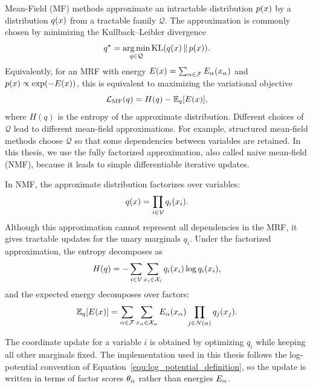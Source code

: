 Mean-Field (MF) methods approximate an intractable distribution $p(x)$ by a distribution $q(x)$ from a tractable family $\mathcal{Q}$. The approximation is commonly chosen by minimizing the Kullback--Leibler divergence
\begin{equation}
    \label{equ:mean_field_kl}
    q^\star
    =
    \operatorname*{arg\,min}_{q\in\mathcal{Q}}
    \mathrm{KL}(q(x)\,\|\,p(x)).
\end{equation}
Equivalently, for an MRF with energy $E(x)=\sum_{\alpha\in\mathcal{F}}E_{\alpha}(x_{\alpha})$ and $p(x)\propto \exp(-E(x))$, this is equivalent to maximizing the variational objective
\begin{equation}
    \label{equ:mean_field_objective}
    \mathcal{L}_{\mathrm{MF}}(q)
    =
    H(q)
    -
    \mathbb{E}_{q}[E(x)] ,
\end{equation}
where $H(q)$ is the entropy of the approximate distribution. Different choices of $\mathcal{Q}$ lead to different mean-field approximations. For example, structured mean-field methods choose $\mathcal{Q}$ so that some dependencies between variables are retained. In this thesis, we use the fully factorized approximation, also called naive mean-field (NMF), because it leads to simple differentiable iterative updates.

In NMF, the approximate distribution factorizes over variables:
\begin{equation}
    \label{equ:nmf_factorization}
    q(x)
    =
    \prod_{i\in\mathcal{V}} q_i(x_i).
\end{equation}
Although this approximation cannot represent all dependencies in the MRF, it gives tractable updates for the unary marginals $q_i$. Under the factorized approximation, the entropy decomposes as
\begin{equation}
    \label{equ:nmf_entropy}
    H(q)
    =
    -\sum_{i\in\mathcal{V}}\sum_{x_i\in\mathcal{X}_i}
    q_i(x_i)\log q_i(x_i),
\end{equation}
and the expected energy decomposes over factors:
\begin{equation}
    \label{equ:nmf_expected_energy}
    \mathbb{E}_q[E(x)]
    =
    \sum_{\alpha\in\mathcal{F}}
    \sum_{x_{\alpha}\in\mathcal{X}_{\alpha}}
    E_{\alpha}(x_{\alpha})
    \prod_{j\in N(\alpha)} q_j(x_j).
\end{equation}

The coordinate update for a variable $i$ is obtained by optimizing $q_i$ while keeping all other marginals fixed. The implementation used in this thesis follows the log-potential convention of Equation~\eqref{equ:log_potential_definition}, so the update is written in terms of factor scores $\theta_{\alpha}$ rather than energies $E_{\alpha}$.

